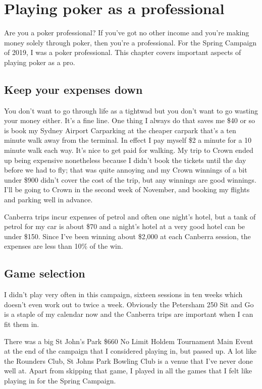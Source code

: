 \chapter{Playing poker as a professional}

Are you a poker professional? If you've got no other income and you're
making money solely through poker, then you're a professional. For the
Spring Campaign of 2019, I was a poker professional. This chapter
covers important aspects of playing poker as a pro.

\section*{Keep your expenses down}

You don't want to go through life as a tightwad but you don't want to
go wasting your money either. It's a fine line. One thing I always do
that saves me \$40 or so is book my Sydney Airport Carparking at the
cheaper carpark that's a ten minute walk away from the
terminal. In effect I pay myself \$2 a minute for a 10 minute walk
each way. It's nice to get paid for walking. My trip to Crown ended up
being expensive nonetheless because I didn't book the tickets until
the day before we had to fly; that was quite annoying and my Crown
winnings of a bit under \$900 didn't cover the cost of the trip, but
any winnings are good winnings. I'll be going to Crown in the second
week of November, and booking my flights and parking well in advance.

Canberra trips incur expenses of petrol and often one night's hotel,
but a tank of petrol for my car is about \$70 and a night's hotel at
a very good hotel can be under \$150. Since I've been winning about
\$2,000 at each Canberra session, the expenses are less than 10\% of
the win.

\section*{Game selection}

I didn't play very often in this campaign, sixteen sessions in ten
weeks which doesn't even work out to twice a week. Obviously the
Petersham 250 Sit and Go is a staple of my calendar now and the
Canberra trips are important when I can fit them in.

There was a big St John's Park \$660 No Limit Holdem Tournament Main
Event at the end of the campaign that I considered playing in, but
passed up. A lot like the Rounders Club, St Johns Park Bowling Club is
a venue that I've never done well at. Apart from skipping that game, I
played in all the games that I felt like playing in for the Spring
Campaign.
